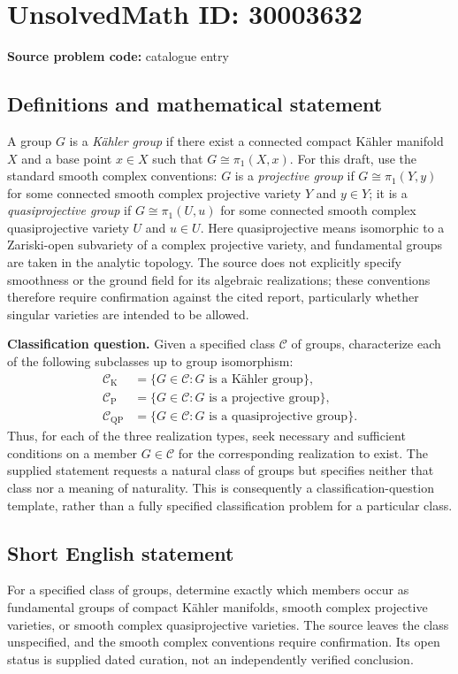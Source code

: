 \documentclass[11pt]{article}
\begin{document}
\section*{UnsolvedMath ID: 30003632}
\textbf{Source problem code:} catalogue entry
\subsection{Definitions and mathematical statement}
A group \(G\) is a \emph{Kähler group} if there exist a connected compact Kähler manifold \(X\) and a base point \(x\in X\) such that \(G\cong\pi_1(X,x)\). For this draft, use the standard smooth complex conventions: \(G\) is a \emph{projective group} if \(G\cong\pi_1(Y,y)\) for some connected smooth complex projective variety \(Y\) and \(y\in Y\); it is a \emph{quasiprojective group} if \(G\cong\pi_1(U,u)\) for some connected smooth complex quasiprojective variety \(U\) and \(u\in U\). Here quasiprojective means isomorphic to a Zariski-open subvariety of a complex projective variety, and fundamental groups are taken in the analytic topology. The source does not explicitly specify smoothness or the ground field for its algebraic realizations; these conventions therefore require confirmation against the cited report, particularly whether singular varieties are intended to be allowed.

\textbf{Classification question.} Given a specified class \(\mathcal C\) of groups, characterize each of the following subclasses up to group isomorphism:
\[
\begin{aligned}
\mathcal C_{\mathrm K}&=\{G\in\mathcal C: G\text{ is a Kähler group}\},\\
\mathcal C_{\mathrm P}&=\{G\in\mathcal C: G\text{ is a projective group}\},\\
\mathcal C_{\mathrm{QP}}&=\{G\in\mathcal C: G\text{ is a quasiprojective group}\}.
\end{aligned}
\]
Thus, for each of the three realization types, seek necessary and sufficient conditions on a member \(G\in\mathcal C\) for the corresponding realization to exist. The supplied statement requests a natural class of groups but specifies neither that class nor a meaning of naturality. This is consequently a classification-question template, rather than a fully specified classification problem for a particular class.
\subsection{Short English statement}
For a specified class of groups, determine exactly which members occur as fundamental groups of compact Kähler manifolds, smooth complex projective varieties, or smooth complex quasiprojective varieties. The source leaves the class unspecified, and the smooth complex conventions require confirmation. Its open status is supplied dated curation, not an independently verified conclusion.
\end{document}
